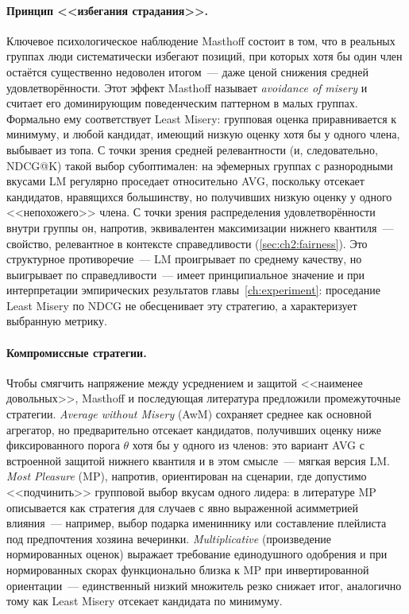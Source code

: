 \paragraph{Принцип <<избегания страдания>>.} Ключевое психологическое наблюдение Masthoff состоит в том, что в реальных группах люди систематически избегают позиций, при которых хотя бы один член остаётся существенно недоволен итогом~--- даже ценой снижения средней удовлетворённости. Этот эффект Masthoff называет \emph{avoidance of misery} и считает его доминирующим поведенческим паттерном в малых группах. Формально ему соответствует Least Misery: групповая оценка приравнивается к минимуму, и любой кандидат, имеющий низкую оценку хотя бы у одного члена, выбывает из топа. С точки зрения средней релевантности (и, следовательно, NDCG@K) такой выбор субоптимален: на эфемерных группах с разнородными вкусами LM регулярно проседает относительно AVG, поскольку отсекает кандидатов, нравящихся большинству, но получивших низкую оценку у одного <<непохожего>> члена. С точки зрения распределения удовлетворённости внутри группы он, напротив, эквивалентен максимизации нижнего квантиля~--- свойство, релевантное в контексте справедливости (\ref{sec:ch2:fairness}). Это структурное противоречие~--- LM проигрывает по среднему качеству, но выигрывает по справедливости~--- имеет принципиальное значение и при интерпретации эмпирических результатов главы~\ref{ch:experiment}: проседание Least Misery по NDCG не обесценивает эту стратегию, а характеризует выбранную метрику.

\paragraph{Компромиссные стратегии.} Чтобы смягчить напряжение между усреднением и защитой <<наименее довольных>>, Masthoff и последующая литература предложили промежуточные стратегии. \emph{Average without Misery} (AwM) сохраняет среднее как основной агрегатор, но предварительно отсекает кандидатов, получивших оценку ниже фиксированного порога $\theta$ хотя бы у одного из членов: это вариант AVG с встроенной защитой нижнего квантиля и в этом смысле~--- мягкая версия LM. \emph{Most Pleasure} (MP), напротив, ориентирован на сценарии, где допустимо <<подчинить>> групповой выбор вкусам одного лидера: в литературе MP описывается как стратегия для случаев с явно выраженной асимметрией влияния~--- например, выбор подарка имениннику или составление плейлиста под предпочтения хозяина вечеринки. \emph{Multiplicative} (произведение нормированных оценок) выражает требование единодушного одобрения и при нормированных скорах функционально близка к MP при инвертированной ориентации~--- единственный низкий множитель резко снижает итог, аналогично тому как Least Misery отсекает кандидата по минимуму.

